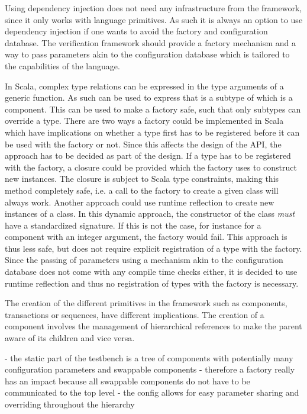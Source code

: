 Using dependency injection does not need any infrastructure from the framework, since it only works with language
primitives. As such it is always an option to use dependency injection if one wants to avoid the factory and
configuration database. The verification framework should provide a factory mechanism and a way to pass parameters
akin to the configuration database which is tailored to the capabilities of the language.

In Scala, complex type relations can be expressed in the type arguments of a generic function. As such \ttt{[T <:
Component, R <: T]} can be used to express that  is a subtype of  which is a component. This can be
used to make a factory safe, such that only subtypes can override a type. There are two ways a factory could be
implemented in Scala which have implications on whether a type first has to be registered before it can be used with
the factory or not. Since this affects the design of the API, the approach has to be decided as part of the design.
If a type has to be registered with the factory, a closure could be provided which the factory uses to construct new
instances. The closure is subject to Scala type constraints, making this method completely safe, i.e. a call to the
factory to create a given class will always work. Another approach could use runtime reflection to create new
instances of a class. In this dynamic approach, the constructor of the class \textit{must} have a standardized
signature. If this is not the case, for instance for a component with an integer argument, the factory would fail.
This approach is thus less safe, but does not require explicit registration of a type with the factory. Since the
passing of parameters using a mechanism akin to the configuration database does not come with any compile time checks
either, it is decided to use runtime reflection and thus no registration of types with the factory is necessary.

The creation of the different primitives in the framework such as components, transactions or sequences, have
different implications. The creation of a component involves the management of hierarchical references to make the
parent aware of its children and vice versa.



- the static part of the testbench is a tree of components with potentially many configuration parameters and swappable components
- therefore a factory really has an impact because all swappable components do not have to be communicated to the top level
- the config allows for easy parameter sharing and overriding throughout the hierarchy


